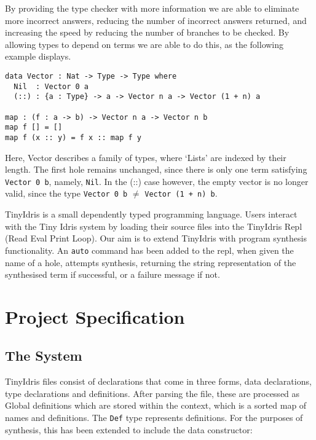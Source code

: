 \documentclass[a4paper]{article}
\begin{document}
By providing the type checker with more information we are able to eliminate more incorrect answers, 
reducing the number of incorrect answers returned, and increasing the speed by reducing the number of branches to be checked. 
By allowing types to depend on terms we are able to do this, as the following example displays.

\begin{center}
\begin{verbatim}
data Vector : Nat -> Type -> Type where
  Nil  : Vector 0 a
  (::) : {a : Type} -> a -> Vector n a -> Vector (1 + n) a

map : (f : a -> b) -> Vector n a -> Vector n b
map f [] = []
map f (x :: y) = f x :: map f y
\end{verbatim}
\end{center}

Here, Vector describes a family of types, where `Lists' are indexed by their length. The first hole remains unchanged, since there 
is only one term satisfying \texttt{Vector 0 b}, namely, \texttt{Nil}. In the (::) case however, the empty vector is no longer valid,
since the type \texttt{Vector 0 b} \(\neq\) \texttt{Vector (1 + n) b}. 

TinyIdris is a small dependently typed programming language.
Users interact with the Tiny Idris system by loading their source files into the TinyIdris Repl (Read Eval Print Loop).
Our aim is to extend TinyIdris with program synthesis functionality. An \texttt{auto} command has been added to the repl, when 
given the name of a hole, attempts synthesis, returning the string representation of the synthesised term if successful, or a failure message if not.

\clearpage

\section{Project Specification}
\label{sec:org0f35aa4}
\subsection{The System}
\label{sec:orgd63243d}

TinyIdris files consist of declarations that come in three forms, data declarations, type declarations and definitions.
After parsing the file, these are processed as Global definitions which are stored within the 
context, which is a sorted map of names and definitions. The \texttt{Def} type represents definitions. For the purposes of synthesis,
this has been extended to include the data constructor:
\end{document}
